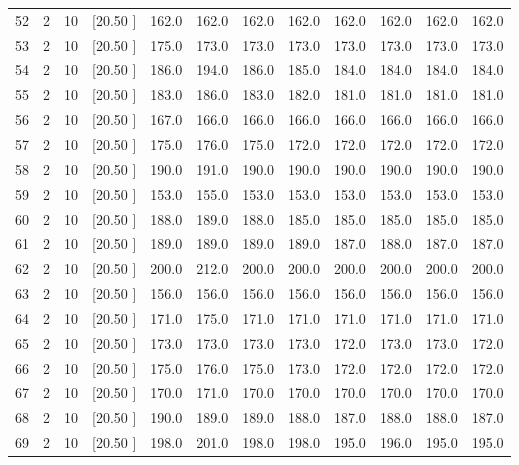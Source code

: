 \documentclass[12pt,a4paper]{article}
\begin{document}
\begin{center}
{\begin{tabular}{r r r r r r r r r r r r}
  52&  2& 10&[20.50     ]&   162.0&   162.0&   162.0&   162.0&   162.0&   162.0&   162.0&   162.0\\[-0.02in]
  53&  2& 10&[20.50     ]&   175.0&   173.0&   173.0&   173.0&   173.0&   173.0&   173.0&   173.0\\[-0.02in]
  54&  2& 10&[20.50     ]&   186.0&   194.0&   186.0&   185.0&   184.0&   184.0&   184.0&   184.0\\[-0.02in]
  55&  2& 10&[20.50     ]&   183.0&   186.0&   183.0&   182.0&   181.0&   181.0&   181.0&   181.0\\[-0.02in]
  56&  2& 10&[20.50     ]&   167.0&   166.0&   166.0&   166.0&   166.0&   166.0&   166.0&   166.0\\[-0.02in]
  57&  2& 10&[20.50     ]&   175.0&   176.0&   175.0&   172.0&   172.0&   172.0&   172.0&   172.0\\[-0.02in]
  58&  2& 10&[20.50     ]&   190.0&   191.0&   190.0&   190.0&   190.0&   190.0&   190.0&   190.0\\[-0.02in]
  59&  2& 10&[20.50     ]&   153.0&   155.0&   153.0&   153.0&   153.0&   153.0&   153.0&   153.0\\[-0.02in]
  60&  2& 10&[20.50     ]&   188.0&   189.0&   188.0&   185.0&   185.0&   185.0&   185.0&   185.0\\[-0.02in]
  61&  2& 10&[20.50     ]&   189.0&   189.0&   189.0&   189.0&   187.0&   188.0&   187.0&   187.0\\[-0.02in]
  62&  2& 10&[20.50     ]&   200.0&   212.0&   200.0&   200.0&   200.0&   200.0&   200.0&   200.0\\[-0.02in]
  63&  2& 10&[20.50     ]&   156.0&   156.0&   156.0&   156.0&   156.0&   156.0&   156.0&   156.0\\[-0.02in]
  64&  2& 10&[20.50     ]&   171.0&   175.0&   171.0&   171.0&   171.0&   171.0&   171.0&   171.0\\[-0.02in]
  65&  2& 10&[20.50     ]&   173.0&   173.0&   173.0&   173.0&   172.0&   173.0&   173.0&   172.0\\[-0.02in]
  66&  2& 10&[20.50     ]&   175.0&   176.0&   175.0&   173.0&   172.0&   172.0&   172.0&   172.0\\[-0.02in]
  67&  2& 10&[20.50     ]&   170.0&   171.0&   170.0&   170.0&   170.0&   170.0&   170.0&   170.0\\[-0.02in]
  68&  2& 10&[20.50     ]&   190.0&   189.0&   189.0&   188.0&   187.0&   188.0&   188.0&   187.0\\[-0.02in]
  69&  2& 10&[20.50     ]&   198.0&   201.0&   198.0&   198.0&   195.0&   196.0&   195.0&   195.0\\[-0.02in]

\end{tabular}}
\end{center}
\end{document}

